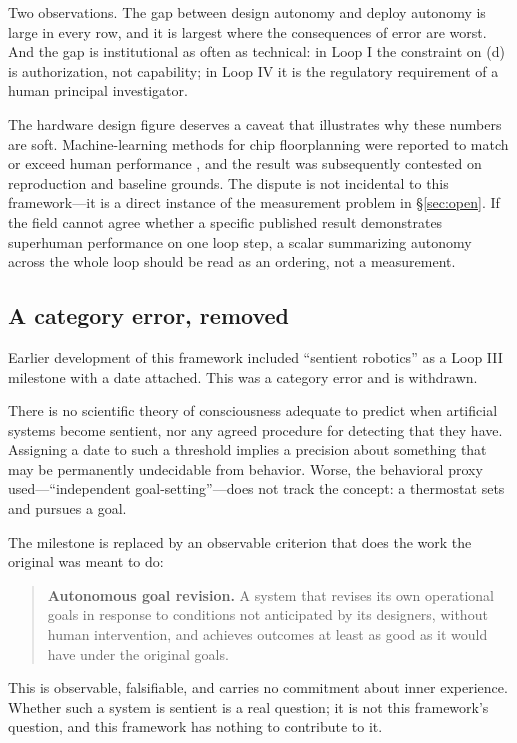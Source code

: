 \documentclass[11pt]{article}
\begin{document}
Two observations. The gap between design autonomy and deploy autonomy is large in every row, and it is largest where the consequences of error are worst. And the gap is institutional as often as technical: in Loop I the constraint on (d) is authorization, not capability; in Loop IV it is the regulatory requirement of a human principal investigator.

The hardware design figure deserves a caveat that illustrates why these numbers are soft. Machine-learning methods for chip floorplanning were reported to match or exceed human performance \citep{mirhoseini2021}, and the result was subsequently contested on reproduction and baseline grounds. The dispute is not incidental to this framework---it is a direct instance of the measurement problem in \S\ref{sec:open}. If the field cannot agree whether a specific published result demonstrates superhuman performance on one loop step, a scalar summarizing autonomy across the whole loop should be read as an ordering, not a measurement.

\subsection{A category error, removed}
\label{sec:sentience}

Earlier development of this framework included ``sentient robotics'' as a Loop III milestone with a date attached. This was a category error and is withdrawn.

There is no scientific theory of consciousness adequate to predict when artificial systems become sentient, nor any agreed procedure for detecting that they have. Assigning a date to such a threshold implies a precision about something that may be permanently undecidable from behavior. Worse, the behavioral proxy used---``independent goal-setting''---does not track the concept: a thermostat sets and pursues a goal.

The milestone is replaced by an observable criterion that does the work the original was meant to do:

\begin{quote}
\textbf{Autonomous goal revision.} A system that revises its own operational goals in response to conditions not anticipated by its designers, without human intervention, and achieves outcomes at least as good as it would have under the original goals.
\end{quote}

This is observable, falsifiable, and carries no commitment about inner experience. Whether such a system is sentient is a real question; it is not this framework's question, and this framework has nothing to contribute to it.
\end{document}
